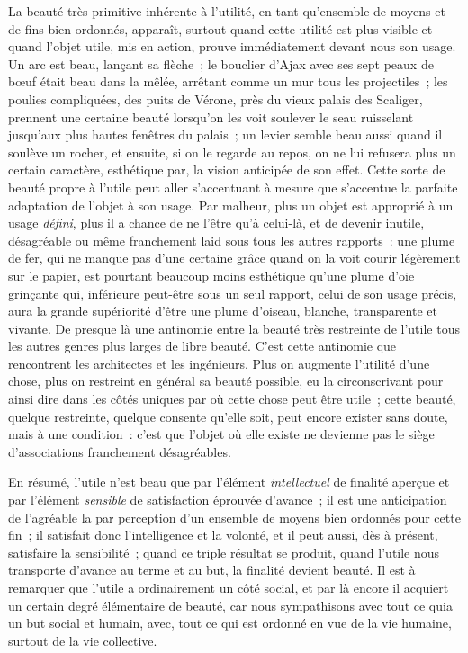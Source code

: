 \documentclass[french,twoside]{book} %
\begin{document}
La beauté très primitive inhérente à l’utilité, en tant qu’ensemble de moyens et de fins bien ordonnés, apparaît, surtout quand cette utilité est plus visible et quand l’objet utile, mis en action, prouve immédiatement devant nous son usage. Un arc est beau, lançant sa flèche ; le bouclier d’Ajax avec ses sept peaux de bœuf était beau dans la mêlée, arrêtant comme un mur tous les projectiles ; les poulies compliquées, des puits de Vérone, près du vieux palais des Scaliger, prennent une certaine beauté lorsqu’on les voit soulever le seau ruisselant jusqu’aux plus hautes fenêtres du palais ; un levier semble beau aussi quand il soulève un rocher, et ensuite, si on le regarde au repos, on ne lui refusera plus un certain caractère, esthétique par, la vision anticipée de son effet. Cette sorte de beauté propre à l’utile peut aller s’accentuant à mesure que s’accentue la parfaite adaptation de l’objet à son usage. Par malheur, plus un objet est approprié à un usage \emph{défini}, plus il a chance de ne l’être qu’à celui-là, et de devenir inutile, désagréable ou même franchement laid sous tous les autres rapports : une plume de fer, qui ne manque pas d’une certaine grâce quand on la voit courir légèrement sur le papier, est pourtant beaucoup moins esthétique qu’une plume d’oie grinçante qui, inférieure peut-être sous un seul rapport, celui de son usage précis, aura la grande supériorité d’être une plume d’oiseau, blanche, transparente et vivante. De presque là une antinomie entre la beauté très restreinte de l’utile tous les autres genres plus larges de libre beauté. C’est cette antinomie que rencontrent les architectes et les ingénieurs. Plus on augmente l’utilité d’une chose, plus on restreint en général sa beauté possible, eu la circonscrivant pour ainsi dire dans les côtés uniques par où cette chose peut être utile ; cette beauté, quelque restreinte, quelque consente qu’elle soit, peut encore exister sans doute, mais à une condition : c’est que l’objet où elle existe ne devienne pas le siège d’associations franchement désagréables.\par
En résumé, l’utile n’est beau que par l’élément \emph{intellectuel} de finalité aperçue et par l’élément \emph{sensible} de satisfaction éprouvée d’avance ; il est une anticipation de l’agréable la par perception d’un ensemble de moyens bien ordonnés pour cette fin ; il satisfait donc l’intelligence et la volonté, et il peut aussi, dès à présent, satisfaire la sensibilité ; quand ce triple résultat se produit, quand l’utile nous transporte d’avance au terme et au but, la finalité devient beauté. Il est à remarquer que l’utile a ordinairement un côté social, et par là encore il acquiert un certain degré élémentaire de beauté, car nous sympathisons avec tout ce quia un but social et humain, avec, tout ce qui est ordonné en vue de la vie humaine, surtout de la vie collective.\par
\end{document}
